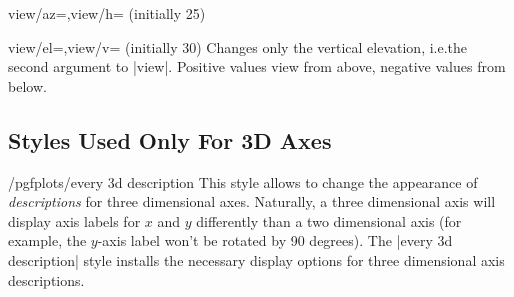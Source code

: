 {\begin{pgfplotskeylist}{view/az=,view/h= (initially 25)}
\pgfplotsexpensiveexample
\begin{codeexample}[]
\end{codeexample}

\pgfplotsexpensiveexample
\begin{codeexample}[]
\end{codeexample}
\end{pgfplotskeylist}

\begin{pgfplotskeylist}{view/el=,view/v= (initially 30)}
    Changes only the vertical elevation, i.e.\@ the second argument to |view|.
    Positive values view from above, negative values from below.
\end{pgfplotskeylist}


\subsection{Styles Used Only For 3D Axes}

\begin{stylekey}{/pgfplots/every 3d description}
    This style allows to change the appearance of \emph{descriptions} for three
    dimensional axes. Naturally, a three dimensional axis will display axis
    labels for $x$ and $y$ differently  than a two dimensional axis (for
    example, the $y$-axis label won't be rotated by 90 degrees). The
    |every 3d description| style installs the necessary display options for
    three dimensional axis descriptions.


\end{stylekey}}
